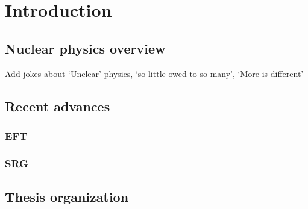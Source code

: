 \cleardoublepage
\chapter{Introduction}

	\section{Nuclear physics overview}

     	Add jokes about `Unclear' physics, `so little owed to so many',
     	`More is different'

	\section{Recent advances}

	\subsection{EFT}

	\subsection{SRG}
	\label{subsec:SRG_intro}

	\section{Thesis organization}
